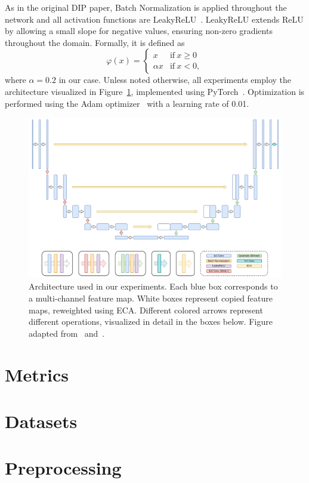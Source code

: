 As in the original DIP paper, Batch Normalization is applied throughout the network and all activation functions are LeakyReLU~\cite{LeakyReLU}.
LeakyReLU extends ReLU by allowing a small slope for negative values, ensuring non-zero gradients throughout the domain.
Formally, it is defined as
\begin{equation}
    \varphi(x) = \begin{cases}
        x &\text{if}\ x \geq 0\\
        \alpha x &\text{if}\ x < 0,
    \end{cases}
\end{equation}
where $\alpha = 0.2$ in our case.
Unless noted otherwise, all experiments employ the architecture visualized in Figure~\ref{fig:architecture}, implemented using PyTorch~\cite{PyTorch}.
Optimization is performed using the Adam optimizer~\cite{Adam} with a learning rate of 0.01.

\begin{figure}
    \centering
    \includegraphics[width=\textwidth]{img/fig_5.2.pdf}
    \caption{
        Architecture used in our experiments.
        Each blue box corresponds to a multi-channel feature map.
        White boxes represent copied feature maps, reweighted using ECA\@.
        Different colored arrows represent different operations, visualized in detail in the boxes below.
        Figure adapted from~\cite{U-Net} and~\cite{DIP}.
    }\label{fig:architecture}
\end{figure}

\section{Metrics}

\section{Datasets}

\section{Preprocessing}
